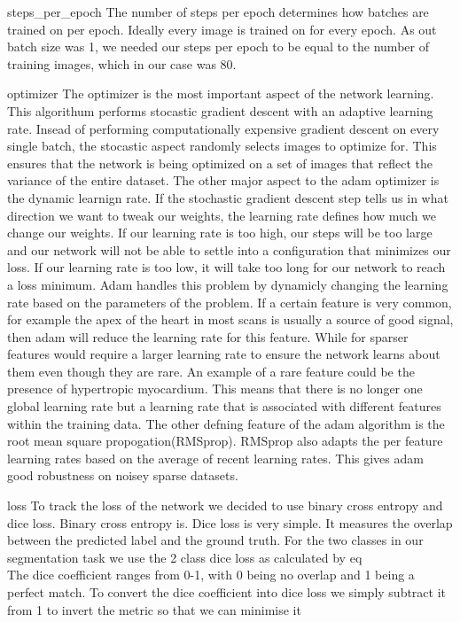 \documentclass[12pt]{article}
\begin{document}
steps\_per\_epoch
The number of steps per epoch determines how batches are trained on per epoch.
Ideally every image is trained on for every epoch.
As out batch size was 1, we needed our steps per epoch to be equal to the number of training images, which in our case was 80.

optimizer
The optimizer is the most important aspect of the network learning.
This algorithum performs stocastic gradient descent with an adaptive learning rate.
Insead of performing computationally expensive gradient descent on every single batch, the stocastic aspect randomly selects images to optimize for.
This ensures that the network is being optimized on a set of images that reflect the variance of the entire dataset.
The other major aspect to the adam optimizer is the dynamic learnign rate.
If the stochastic gradient descent step tells us in what direction we want to tweak our weights, the learning rate defines how much we change our weights.
If our learning rate is too high, our steps will be too large and our network will not be able to settle into a configuration that minimizes our loss.
If our learning rate is too low, it will take too long for our network to reach a loss minimum.
Adam handles this problem by dynamicly changing the learning rate based on the parameters of the problem.
If a certain feature is very common, for example the apex of the heart in most scans is usually a source of good signal, then adam will reduce the learning rate for this feature.
While for sparser features would require a larger learning rate to ensure the network learns about them even though they are rare.
An example of a rare feature could be the presence of hypertropic myocardium.
This means that there is no longer one global learning rate but a learning rate that is associated with different features within the training data.
The other defning feature of the adam algorithm is the root mean square propogation(RMSprop).
RMSprop also adapts the per feature learning rates based on the average of recent learning rates.
This gives adam good robustness on noisey sparse datasets.\cite{adam_opt}

loss
To track the loss of the network we decided to use binary cross entropy and dice loss.
Binary cross entropy is. %
Dice loss is very simple. It measures the overlap between the predicted label and the ground truth.
For the two classes in our segmentation task we use the 2 class dice loss as calculated by eq %
\begin{equation}
\end{equation}
The dice coefficient ranges from 0-1, with 0 being no overlap and 1 being a perfect match.
To convert the dice coefficient into dice loss we simply subtract it from 1 to invert the metric so that we can minimise it
\end{document}
